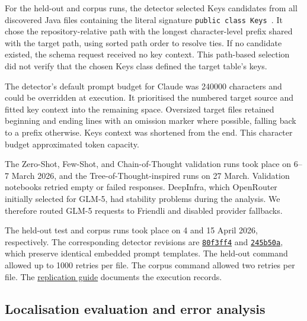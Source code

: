 For the held-out and corpus runs, the detector selected Keys candidates from all discovered Java files containing the literal signature \texttt{public class Keys }. It chose the repository-relative path with the longest character-level prefix shared with the target path, using sorted path order to resolve ties. If no candidate existed, the schema request received no key context. This path-based selection did not verify that the chosen Keys class defined the target table's keys.

The detector's default prompt budget for Claude was \num{240000} characters and could be overridden at execution. It prioritised the numbered target source and fitted key context into the remaining space. Oversized target files retained beginning and ending lines with an omission marker where possible, falling back to a prefix otherwise. Keys context was shortened from the end. This character budget approximated token capacity.

The Zero-Shot, Few-Shot, and Chain-of-Thought validation runs took place on 6--7 March 2026, and the Tree-of-Thought-inspired runs on 27 March. Validation notebooks retried empty or failed responses. DeepInfra, which OpenRouter initially selected for GLM-5, had stability problems during the analysis. We therefore routed GLM-5 requests to Friendli and disabled provider fallbacks.

The held-out test and corpus runs took place on 4 and 15 April 2026, respectively. The corresponding detector revisions are \href{https://github.com/kristoisberg/jooq-antipattern-detector/tree/80f3ff4eeabdc3fec860bc35bb9a4566fe130763}{\texttt{80f3ff4}} and \href{https://github.com/kristoisberg/jooq-antipattern-detector/tree/245b50aa381d9917e5febf9f4ab0cd13d1b9d944}{\texttt{245b50a}}, which preserve identical embedded prompt templates. The held-out command allowed up to \num{1000} retries per file. The corpus command allowed two retries per file. The \href{https://github.com/kristoisberg/thesis-paper/blob/80a9898da632ee43e81cc9404365f9f5f21c3bb1/analysis/README.md\#original-model-executions}{replication guide} documents the execution records.

\subsection{Localisation evaluation and error analysis}

